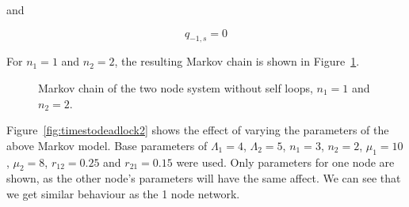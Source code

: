 \documentclass{article}
\begin{document}
and

\begin{equation}
  q_{-1, s} = 0
\end{equation}

For $n_1 = 1$ and $n_2 = 2$, the resulting Markov chain is shown in Figure~\ref{fig:2nodeMC}.

\begin{figure}[H]
    
    \caption{Markov chain of the two node system without self loops, $n_1=1$ and $n_2=2$.}
    \label{fig:2nodeMC}
\end{figure}

Figure~\ref{fig:timestodeadlock2} shows the effect of varying the parameters of the above Markov model.
Base parameters of $\Lambda_1 = 4$, $\Lambda_2 = 5$, $n_1 = 3$, $n_2 = 2$, $\mu_1 = 10$, $\mu_2 = 8$, $r_{12} = 0.25$ and $r_{21} = 0.15$ were used.
Only parameters for one node are shown, as the other node's parameters will have the same affect.
We can see that we get similar behaviour as the 1 node network.
\end{document}
